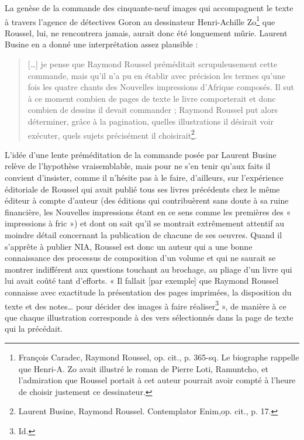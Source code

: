 \documentclass[nofonts]{tufte-handout}
\begin{document}
La genèse de la commande des cinquante-neuf images qui accompagnent le texte à travers l’agence de détectives Goron au dessinateur Henri-Achille Zo\footnote{François Caradec, Raymond Roussel, op. cit., p. 365-sq. Le biographe rappelle que Henri-A. Zo avait illustré le roman de Pierre Loti, Ramuntcho, et l’admiration que Roussel portait à cet auteur pourrait avoir compté à l’heure de choisir justement ce dessinateur.} que Roussel, lui, ne rencontrera jamais, aurait donc été longuement mûrie. Laurent Busine en a donné une interprétation assez plausible :

\begin{quote}
[\ldots{}] je pense que Raymond Roussel préméditait scrupuleusement cette commande, mais qu’il n’a pu en établir avec précision les termes qu’une fois les quatre chants des Nouvelles impressions d’Afrique composés. Il sut à ce moment combien de pages de texte le livre comporterait et donc combien de dessins il devait commander ; Raymond Roussel put alors déterminer, grâce à la pagination, quelles illustrations il désirait voir exécuter, quels sujets précisément il choisirait\footnote{Laurent Busine, Raymond Roussel. Contemplator Enim,op. cit., p. 17.}.
\end{quote}

L’idée d’une lente préméditation de la commande posée par Laurent Busine relève de l’hypothèse vraisemblable, mais pour ne s’en tenir qu’aux faits il convient d’insister, comme il n’hésite pas à le faire, d’ailleurs, sur l’expérience éditoriale de Roussel qui avait publié tous ses livres précédents chez le même éditeur à compte d’auteur (des éditions qui contribuèrent sans doute à sa ruine financière, les Nouvelles impressions étant en ce sens comme les premières des « impressions à fric ») et dont on sait qu’il se montrait extrêmement attentif au moindre détail concernant la publication de chacune de ses oeuvres. Quand il s’apprête à publier NIA, Roussel est donc un auteur qui a une bonne connaissance des processus de composition d’un volume et qui ne saurait se montrer indifférent aux questions touchant au brochage, au pliage d’un livre qui lui avait coûté tant d’efforts. « Il fallait [par exemple] que Raymond Roussel connaisse avec exactitude la présentation des pages imprimées, la disposition du texte et des notes… pour décider des images à faire réaliser\footnote{Id.} », de manière à ce que chaque illustration corresponde à des vers sélectionnés dans la page de texte qui la précédait.
\end{document}
